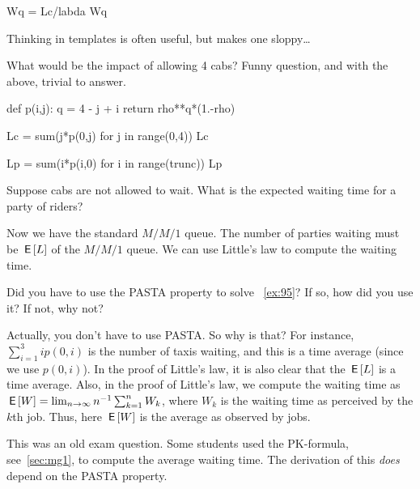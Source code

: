 \begin{exercise}[Hall 5.22]
\begin{solution}
\begin{pyconsole}
Wq = Lc/labda
Wq
\end{pyconsole}

Thinking in templates is often useful, but makes one sloppy\ldots

What would be the impact of allowing 4 cabs? Funny question, and with the above, trivial to answer.

\begin{pyconsole}
def p(i,j):
    q  = 4 - j + i
    return rho**q*(1.-rho)
  
\end{pyconsole}

\begin{pyconsole}
Lc = sum(j*p(0,j) for j in range(0,4))
Lc

Lp = sum(i*p(i,0) for i in range(trunc))
Lp
  
\end{pyconsole}
\end{solution}
\end{exercise}


\begin{extra}
Suppose  cabs are not allowed to wait. What is the expected waiting time for a party of riders?

\begin{solution}
Now we have the standard $M/M/1$ queue. The number of parties waiting must be $\,\mathsf{E}\left[L\right]$ of the $M/M/1$ queue. We can use Little's law to compute the waiting time.
\end{solution}
\end{extra}



\begin{exercise}
  Did you have to use the PASTA property to solve ~\cref{ex:95}? If so, how did you use it? If not, why not?
\begin{solution}
  Actually, you don't have to use PASTA.
  So why is that?
  For instance, $\sum_{i=1}^3 i p(0, i)$ is the number of taxis waiting, and this is a time average (since we use $p(0, i)$).
  In the proof of Little's law, it is also clear that the $\,\mathsf{E}\left[L\right]$ is a time average.
  Also, in the proof of Little's law, we compute the waiting time as $\,\mathsf{E}\left[W\right] = \lim_{n\to\infty} n^{-1}\sum_{k=1}^n W_k$, where $W_k$ is the waiting time as perceived by the $k$th job.
  Thus, here $\,\mathsf{E}\left[W\right]$ is the average as observed by jobs.

  This was an old exam question.
  Some students used the PK-formula, see~\cref{sec:mg1}, to compute the average waiting time.
  The derivation of this \emph{does} depend on the PASTA property.
\end{solution}
\end{exercise}


